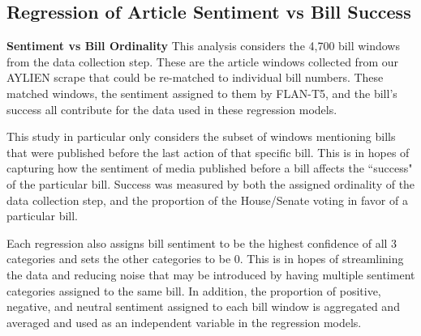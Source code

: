 \documentclass[letterpaper,11pt]{article}
\begin{document}
\vspace{.1in}
\subsection{Regression of Article Sentiment vs Bill Success}
    \textbf{Sentiment vs Bill Ordinality}
    This analysis considers the 4,700 bill windows from the data collection step. These are the article windows collected from our AYLIEN scrape that could be re-matched to individual bill numbers. These matched windows, the sentiment assigned to them by FLAN-T5, and the bill's success all contribute for the data used in these regression models. 

    This study in particular only considers the subset of windows mentioning bills that were published before the last action of that specific bill. This is in hopes of capturing how the sentiment of media published before a bill affects the ``success" of the particular bill. Success was measured by both the assigned ordinality of the data collection step, and the proportion of the House/Senate voting in favor of a particular bill. 

    Each regression also assigns bill sentiment to be the highest confidence of all 3 categories and sets the other categories to be 0. This is in hopes of streamlining the data and reducing noise that may be introduced by having multiple sentiment categories assigned to the same bill. In addition, the proportion of positive, negative, and neutral sentiment assigned to each bill window is aggregated and averaged and used as an independent variable in the regression models. \\
\end{document}
